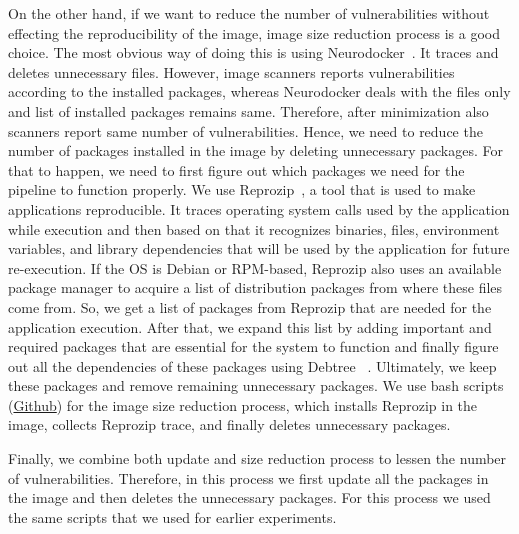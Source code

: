 \documentclass[a4paper,num-refs]{oup-contemporary}
\begin{document}
On the other hand, if we want to reduce the number of vulnerabilities without effecting the reproducibility of the image,
image size reduction process is a good choice. The most obvious way of doing this is using 
Neurodocker~\cite{neurodocker}.
It traces and deletes unnecessary files.
However, image scanners reports vulnerabilities according to the installed
packages, whereas Neurodocker deals with the files only and list of installed packages remains same. Therefore, after
minimization also scanners report same number of vulnerabilities.
Hence, we need to reduce the number of packages
installed in the image by deleting unnecessary packages. For that to happen, we need to first figure
out which packages we need for the pipeline to function properly. We use
Reprozip~\cite{rampin2016reprozip}, a tool that
is used to make applications reproducible. It traces operating system calls used by the
application while execution and then based on that it recognizes binaries, files, environment variables,
and library dependencies that will be used by the application for future re-execution. If the OS is
Debian or RPM-based, Reprozip also
uses an available package manager to acquire a list of distribution packages from where these files come from.
So, we get a list of packages from Reprozip that are needed for the application execution. 
After that, we expand this list by adding important and required packages that are essential
for the system to function and finally figure out all the dependencies of these packages using Debtree
~\cite{debtree}.
Ultimately, we keep these packages and remove remaining unnecessary packages. We use bash scripts
(\href{https://github.com/kaurbhupinder/Vulnerability-Analysis/tree/master/Scripts/minification}{Github}) for
the image size reduction process, which installs Reprozip in the image, collects Reprozip trace, and
finally deletes unnecessary packages.

Finally, we combine both update and size reduction process
to lessen the number of vulnerabilities.
Therefore, in this process we first update all the packages in the image and then deletes
the unnecessary packages. For this process we used the same scripts that
we used for earlier experiments.
\end{document}

